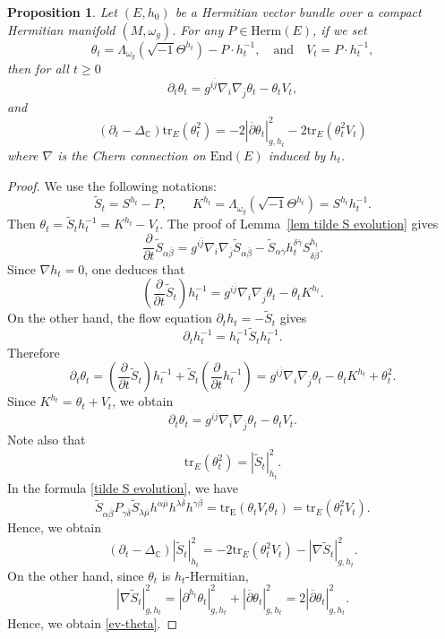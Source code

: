 \documentclass[12pt, reqno]{amsart}
\newcommand\bp{{\bar\partial}}
\theoremstyle{plain}
\newtheorem{prop}[thm]{Proposition}
\theoremstyle{definition}
\newcommand{\bproposition}{\begin{prop}}
\newcommand{\eproposition}{\end{prop}}
\newcommand{\bproof}{\begin{proof}}
\newcommand{\eproof}{\end{proof}}
\newcommand{\sq}{\sqrt{-1}}
\newcommand{\p}{\partial}
\renewcommand{\bar}{\overline}
\newcommand{\beq}{\begin{equation}}
\newcommand{\eeq}{\end{equation}}
\renewcommand{\tilde}{\widetilde}
\newcommand{\qtq}[1]{\quad\mbox{#1}\quad}
\renewcommand{\bp}{\bar{\partial}}
\renewcommand{\>}{\rightarrow}
\newcommand{\C}{{\mathbb C}}
\renewcommand{\>}{\rightarrow}
\renewcommand{\p}{{\partial}}
\renewcommand{\bp}{{\bar{\partial}}}
\newcommand{\om}{\omega}
\renewcommand{\bar}{\overline}
\renewcommand{\tilde}{\widetilde}
\newcommand{\tr}{\mathrm{tr}}
\numberwithin{equation}{section} %
\begin{document}
\bproposition  \label{prop new observation}
Let  $(E,h_0)$ be a Hermitian vector bundle over a compact Hermitian manifold
$(M,\omega_g)$. For any $P\in \mathrm{Herm}(E)$,  if we set \beq \theta_t=\Lambda_{\om_g}\left(\sqrt{-1}\Theta^{h_t}\right)-P\cdot h_t^{-1}, \qtq{and} V_t=P\cdot h_t^{-1}, \eeq  then for all $t\geq 0$
\beq
\partial_t\theta_t=g^{i\bar j}\nabla_i\nabla_{\bar j}\theta_t-\theta_tV_t,
\eeq
and
\beq
\left(\p_t-\Delta_\C\right)\tr_E\left(\theta_t^2\right)= -2\left|\bp \theta_t\right|_{g,h_t}^2 -2\tr_E\left(\theta_t^2 V_t\right)\label{ev-theta}
\eeq
where $\nabla$ is the Chern connection on $\mathrm{End}(E)$ induced by $h_t$.
\eproposition

\bproof  We use the following notations:
\beq
\tilde S_t=S^{h_t}-P,
\qquad
K^{h_t}=\Lambda_{\om_g}\left(\sq\Theta^{h_t}\right)=S^{h_t}h_t^{-1}.
\eeq
Then $\theta_t=\tilde S_t h_t^{-1}=K^{h_t}-V_t$.  The proof of Lemma~\ref{lem tilde S evolution} gives
\beq
\frac{\p}{\p t}\tilde S_{\alpha\bar\beta}
= g^{i\bar j}\nabla_i\nabla_{\bar j}\tilde S_{\alpha\bar\beta}
-\tilde S_{\alpha\bar\gamma}h_t^{\delta\bar\gamma}S^{h_t}_{\delta\bar\beta}.
\label{tilde S time derivative formula}
\eeq
Since $\nabla h_t=0$, one deduces that
\beq
\left(\frac{\p}{\p t}\tilde S_t\right)h_t^{-1}
=g^{i\bar j}\nabla_i\nabla_{\bar j}\theta_t-\theta_tK^{h_t}.
\eeq
On the other hand, the flow equation $\p_t h_t=-\tilde S_t$ gives
\beq
\p_t h_t^{-1}=h_t^{-1}\tilde S_t h_t^{-1}.
\eeq
Therefore
\beq
\p_t\theta_t
=\left(\frac{\p}{\p t}\tilde S_t\right)h_t^{-1}
+\tilde S_t\left(\frac{\p}{\p t}h_t^{-1}\right)=g^{i\bar j}\nabla_i\nabla_{\bar j}\theta_t-
\theta_tK^{h_t}+\theta_t^2.
\eeq
Since $K^{h_t}=\theta_t+V_t$, we obtain
\beq
\p_t\theta_t=g^{i\bar j}\nabla_i\nabla_{\bar j}\theta_t-\theta_tV_t.
\eeq
Note also that
\beq
\tr_E(\theta_t^2)=|\tilde S_t|_{h_t}^2.
\eeq
In the formula \eqref{tilde S evolution}, we have
\beq \tilde S_{\alpha\bar\beta}  P_{\gamma\bar\delta}\tilde S_{\lambda\bar \mu} h^{\alpha\bar \mu}  h^{\lambda \bar \delta} h^{\gamma\bar\beta}=\mathrm{tr_E}(\theta_t V_t \theta_t)=\tr_E(\theta_t^2V_t).\eeq
Hence, we obtain
\beq
\left(\p_t-\Delta_\C\right)|\tilde S_t|_{h_t}^2
=-2\tr_E(\theta_t^2V_t)-|\nabla\tilde S_t|_{g,h_t}^2.
\eeq
On the other hand, since $\theta_t$ is $h_t$-Hermitian,
\beq
|\nabla\tilde S_t|_{g,h_t}^2=|\p^{h_t}\theta_t|_{g,h_t}^2+|\bp\theta_t|_{g,h_t}^2=2|\bp\theta_t|_{g,h_t}^2.
\eeq
Hence, we obtain \eqref{ev-theta}.
\eproof
\end{document}
